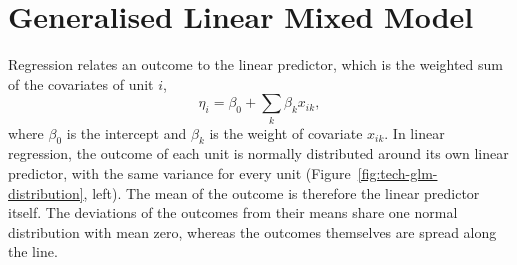 \section{Generalised Linear Mixed Model}
\label{sec:tech-model}

Regression relates an outcome to the linear predictor, which is the weighted sum of the covariates of unit $i$,
\begin{equation}
  \eta_i = \beta_0 + \sum_{k} \beta_k x_{ik},
  \label{eq:tech-lp}
\end{equation}
where $\beta_0$ is the intercept and $\beta_k$ is the weight of covariate $x_{ik}$.
In linear regression, the outcome of each unit is normally distributed around its own linear predictor, with the same variance for every unit (Figure~\ref{fig:tech-glm-distribution}, left).
The mean of the outcome is therefore the linear predictor itself.
The deviations of the outcomes from their means share one normal distribution with mean zero, whereas the outcomes themselves are spread along the line.

